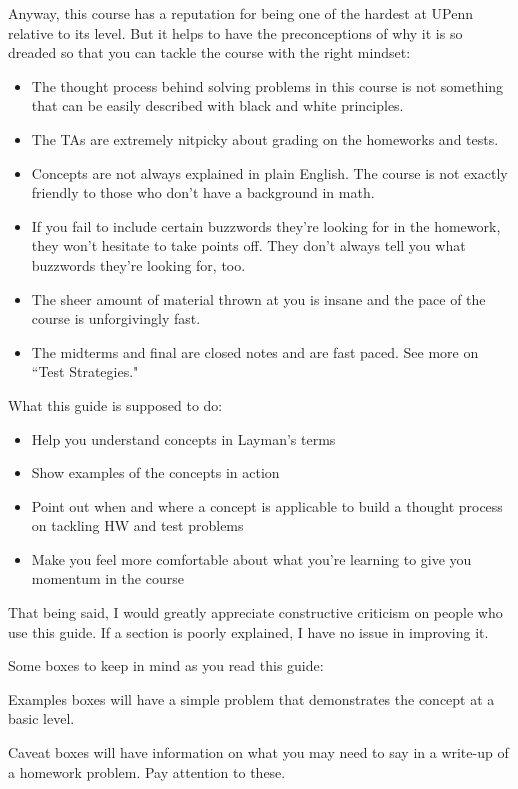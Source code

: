 \documentclass[11pt]{scrartcl}
\begin{document}
Anyway, this course has a reputation for being one of the hardest at UPenn relative to its level. But it helps to have the preconceptions of why it is so dreaded so that you can tackle the course with the right mindset:
\begin{itemize}
\item The thought process behind solving problems in this course is not something that can be easily described with black and white principles.
\item The TAs are extremely nitpicky about grading on the homeworks and tests.
\item Concepts are not always explained in plain English. The course is not exactly friendly to those who don't have a background in math.
\item If you fail to include certain buzzwords they're looking for in the homework, they won't hesitate to take points off. They don't always tell you what buzzwords they're looking for, too.
\item The sheer amount of material thrown at you is insane and the pace of the course is unforgivingly fast.
\item The midterms and final are closed notes and are fast paced. See more on ``Test Strategies."
\end{itemize}
What this guide is supposed to do:
\begin{itemize}
    \item Help you understand concepts in Layman's terms
    \item Show examples of the concepts in action
    \item Point out when and where a concept is applicable to build a thought process on tackling HW and test problems
    \item Make you feel more comfortable about what you're learning to give you momentum in the course
\end{itemize}
That being said, I would greatly appreciate constructive criticism on people who use this guide. If a section is poorly explained, I have no issue in improving it.

Some boxes to keep in mind as you read this guide:

\begin{example}
    Examples boxes will have a simple problem that demonstrates the concept at a basic level.
\end{example}

\begin{caveat}
    Caveat boxes will have information on what you may need to say in a write-up of a homework problem. Pay attention to these.
\end{caveat}
\end{document}

